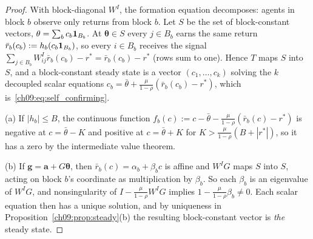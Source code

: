 \documentclass[../structural_economics_book.tex]{subfiles}
\begin{document}
\begin{proof}
With block-diagonal $W^I$, the formation equation decomposes: agents in block $b$ observe only returns from block $b$. Let $S$ be the set of block-constant vectors, $\theta = \sum_b c_b \mathbf{1}_{B_b}$. At $\boldsymbol{\theta} \in S$ every $j \in B_b$ earns the same return $\bar{r}_b(c_b) := h_b(c_b\mathbf{1}_{B_b})$, so every $i \in B_b$ receives the signal $\sum_{j \in B_b} W^I_{ij}\bar{r}_b(c_b) - r^* = \bar{r}_b(c_b) - r^*$ (rows sum to one). Hence $T$ maps $S$ into $S$, and a block-constant steady state is a vector $(c_1, \ldots, c_k)$ solving the $k$ decoupled scalar equations $c_b = \bar{\theta} + \frac{\mu}{1-\rho}(\bar{r}_b(c_b) - r^*)$, which is~\eqref{ch09:eq:self_confirming}.

(a) If $|h_b| \le B$, the continuous function $f_b(c) := c - \bar{\theta} - \frac{\mu}{1-\rho}(\bar{r}_b(c) - r^*)$ is negative at $c = \bar{\theta} - K$ and positive at $c = \bar{\theta} + K$ for $K > \frac{\mu}{1-\rho}(B + |r^*|)$, so it has a zero by the intermediate value theorem.

(b) If $\mathbf{g} = \mathbf{a} + G\boldsymbol{\theta}$, then $\bar{r}_b(c) = \alpha_b + \beta_b c$ is affine and $W^IG$ maps $S$ into $S$, acting on block $b$'s coordinate as multiplication by $\beta_b$. So each $\beta_b$ is an eigenvalue of $W^IG$, and nonsingularity of $I - \frac{\mu}{1-\rho}W^IG$ implies $1 - \frac{\mu}{1-\rho}\beta_b \ne 0$. Each scalar equation then has a unique solution, and by uniqueness in Proposition~\ref{ch09:prop:steady}(b) the resulting block-constant vector is \textit{the} steady state.
\end{proof}
\end{document}

